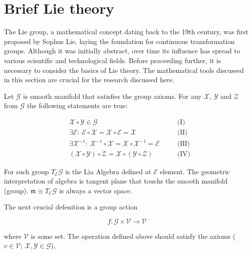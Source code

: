 \appendix
\chapter{Brief Lie theory}

The Lie group, a mathematical concept dating back to the 19th century, was first 
proposed by Sophus Lie, laying the foundation for continuous transformation groups. 
Although it was initially abstract, over time its influence has spread to various 
scientific and technological fields. Before proceeding further, it is necessary to 
consider the basics of Lie theory. The mathematical tools discussed in this section 
are crucial for the research discussed here.

Let $\mathcal{G}$ is smooth manifold that satisfies the group axioms. For any 
$\mathcal{X}$, $\mathcal{Y}$ and $\mathcal{Z}$ from $\mathcal{G}$ the following 
statements are true:

\begin{equation}
    \begin{aligned}
        \label{eqn:g_axi}
        & \mathcal{X} \circ \mathcal{Y} \in \mathcal{G} \quad && \text{(I)} \\
        & \exists \mathcal{E}:\ \mathcal{E} \circ \mathcal{X} 
        = \mathcal{X} \circ \mathcal{E} = \mathcal{X} \quad && \text{(II)} \\
        & \exists \mathcal{X}^{-1}:\ \mathcal{X}^{-1} \circ \mathcal{X}
        = \mathcal{X} \circ \mathcal{X}^{-1} = \mathcal{E} \quad && \text{(III)} \\ 
        & (\mathcal{X} \circ \mathcal{Y}) \circ \mathcal{Z} = 
        \mathcal{X} \circ (\mathcal{Y} \circ \mathcal{Z}) \quad && \text{(IV)}
    \end{aligned}
\end{equation}

For such group $T_{\mathcal{E}} \mathcal{G}$ is the Lia Algebra defined at 
$\mathcal{E}$ element. The geometric interpretation of algebra is tangent plane 
that touchs the smooth manifold (group). $\mathfrak{m} \equiv 
T_{\mathcal{E}} \mathcal{G}$ is always a vector space.

The next crucial defenition is a group action

\begin{equation}
    f: \mathcal{G} \times \mathcal{V} \to \mathcal{V}
\end{equation}

where $\mathcal{V}$ is some set. The operation defined above should satisfy 
the axioms ($v \in \mathcal{V}$; $\mathcal{X}, \mathcal{Y} \in \mathcal{G}$),

